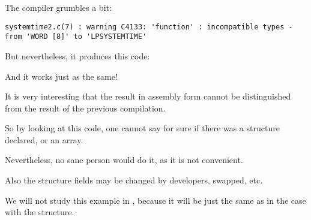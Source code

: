 

The compiler grumbles a bit:

\begin{lstlisting}
systemtime2.c(7) : warning C4133: 'function' : incompatible types - from 'WORD [8]' to 'LPSYSTEMTIME'
\end{lstlisting}

But nevertheless, it produces this code:



And it works just as the same!

It is very interesting that the
result in assembly form cannot be distinguished from the result of the previous compilation.

So by looking at this code, one cannot say for sure if there was a structure declared, or an array. 

Nevertheless, no sane person would do it, as it is not convenient. 

Also the structure fields may be changed by developers, swapped, etc.

We will not study this example in \olly, because it will be just the same as in the case with the structure.

